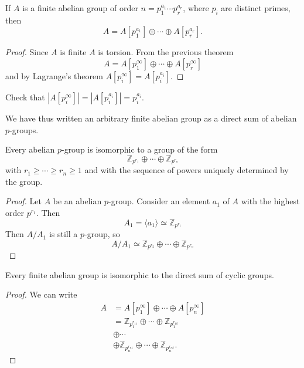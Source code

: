 \begin{corol}
If $A$ is a finite abelian group of order $n = p_1^{a_1} \cdots
p_r^{a_r}$, where $p_i$ are distinct primes, then
$$
A = A[p_1^{a_1}] \oplus \cdots \oplus A[p_r^{a_r}].
$$
\end{corol}
\begin{proof}
Since $A$ is finite $A$ is torsion. From the previous theorem
$$
A = A[p_1^\infty] \oplus \cdots \oplus A[p_r^{\infty}]
$$
and by Lagrange's theorem $A[p_i^\infty] = A[p_i^{a_i}]$.
\end{proof}

\begin{exer}
Check that
$|A[p_i^\infty]| = |A[p_i^{a_i}]| = p_i^{a_i}$.
\end{exer}

We have thus written an arbitrary finite abelian group as a direct sum
of abelian $p$-groups.

\begin{theorem}
Every abelian $p$-group is isomorphic to a group of the form
$$
\mathbb{Z}_{p^{r_1}} \oplus \cdots \oplus \mathbb{Z}_{p^{r_n}}
$$
with $r_1 \geq \cdots \geq r_n \geq 1$ and with the sequence of
powers uniquely determined by the group.
\end{theorem}
\begin{proof}
Let $A$ be an abelian $p$-group. Consider an element $a_1$ of $A$ with
the highest order $p^{r_1}$. Then
$$
A_1 = \langle a_1 \rangle \simeq \mathbb{Z}_{p^{r_1}}
$$
Then $A / A_1$ is still a $p$-group, so
$$
A / A_1 \simeq \mathbb{Z}_{p^{r_2}} \oplus \cdots \oplus \mathbb{Z}_{p^{r_n}}
$$
\end{proof}

\begin{corol}
Every finite abelian group is isomorphic to the direct sum of cyclic groups.
\end{corol}
\begin{proof}
We can write
\begin{align*}
A &= A[p_1^\infty] \oplus \cdots \oplus A[p_n^\infty] \\
  &=      \mathbb{Z}_{p_1^{r_{11}}} \oplus \cdots \oplus \mathbb{Z}_{p_1^{r_{1k}}} \\
  &\oplus \cdots \\
  &\oplus \mathbb{Z}_{p_n^{r_{n1}}} \oplus \cdots \oplus \mathbb{Z}_{p_n^{r_{nk}}}.
\end{align*}
\end{proof}
